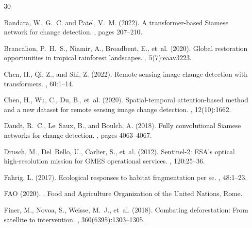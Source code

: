 \begin{thebibliography}{30}

Bandara, W.~G.~C. and Patel, V.~M. (2022).
\newblock A transformer-based Siamese network for change detection.
, pages 207--210.

Brancalion, P.~H.~S., Niamir, A., Broadbent, E., et~al. (2020).
\newblock Global restoration opportunities in tropical rainforest landscapes.
, 5(7):eaav3223.

Chen, H., Qi, Z., and Shi, Z. (2022).
\newblock Remote sensing image change detection with transformers.
, 60:1--14.

Chen, H., Wu, C., Du, B., et~al. (2020).
\newblock Spatial-temporal attention-based method and a new dataset for remote sensing image change detection.
, 12(10):1662.

Daudt, R.~C., Le~Saux, B., and Boulch, A. (2018).
\newblock Fully convolutional Siamese networks for change detection.
, pages 4063--4067.

Drusch, M., Del~Bello, U., Carlier, S., et~al. (2012).
\newblock Sentinel-2: ESA's optical high-resolution mission for GMES operational services.
, 120:25--36.

Fahrig, L. (2017).
\newblock Ecological responses to habitat fragmentation per se.
, 48:1--23.

FAO (2020).
.
\newblock Food and Agriculture Organization of the United Nations, Rome.

Finer, M., Novoa, S., Weisse, M.~J., et~al. (2018).
\newblock Combating deforestation: From satellite to intervention.
, 360(6395):1303--1305.


\end{thebibliography}
